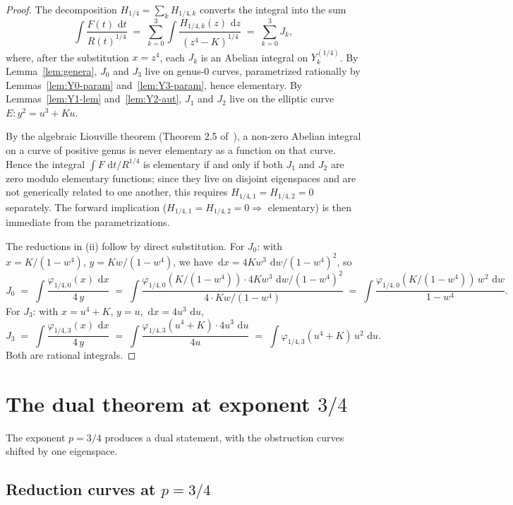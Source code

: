 \documentclass[11pt,a4paper]{article}
\theoremstyle{plain}
\theoremstyle{definition}
\theoremstyle{remark}
\renewcommand{\d}{\,\mathrm{d}}
\begin{document}
\begin{proof}
The decomposition $H_{1/4} = \sum_k H_{1/4, k}$ converts the integral into the sum
\[
  \int \frac{F(t)\,\d t}{R(t)^{1/4}} \;=\; \sum_{k=0}^{3} \int \frac{H_{1/4, k}(z)\,\d z}{(z^4 - K)^{1/4}} \;=\; \sum_{k=0}^{3} J_k,
\]
where, after the substitution $x = z^4$, each $J_k$ is an Abelian integral on $Y_k^{(1/4)}$. By Lemma~\ref{lem:genera}, $J_0$ and $J_3$ live on genus-$0$ curves, parametrized rationally by Lemmas~\ref{lem:Y0-param} and~\ref{lem:Y3-param}, hence elementary. By Lemmas~\ref{lem:Y1-lem} and~\ref{lem:Y2-aut}, $J_1$ and $J_2$ live on the elliptic curve $E\colon y^2 = u^3 + Ku$.

By the algebraic Liouville theorem (Theorem 2.5 of~\cite{GoursatCubic}), a non-zero Abelian integral on a curve of positive genus is never elementary as a function on that curve. Hence the integral $\int F\,\d t / R^{1/4}$ is elementary if and only if both $J_1$ and $J_2$ are zero modulo elementary functions; since they live on disjoint eigenspaces and are not generically related to one another, this requires $H_{1/4, 1} = H_{1/4, 2} = 0$ separately. The forward implication ($H_{1/4, 1} = H_{1/4, 2} = 0 \Rightarrow$ elementary) is then immediate from the parametrizations.

The reductions in (ii) follow by direct substitution. For $J_0$: with $x = K/(1-w^4)$, $y = Kw/(1-w^4)$, we have $\d x = 4 K w^3\,\d w/(1-w^4)^2$, so
\[
  J_0 \;=\; \int \frac{\varphi_{1/4,0}(x)\,\d x}{4\,y} \;=\; \int \frac{\varphi_{1/4,0}(K/(1-w^4)) \cdot 4 K w^3\,\d w / (1-w^4)^2}{4 \cdot K w/(1-w^4)} \;=\; \int \frac{\varphi_{1/4,0}(K/(1-w^4))\,w^2\,\d w}{1 - w^4}.
\]
For $J_3$: with $x = u^4 + K$, $y = u$, $\d x = 4u^3\,\d u$,
\[
  J_3 \;=\; \int \frac{\varphi_{1/4,3}(x)\,\d x}{4\,y} \;=\; \int \frac{\varphi_{1/4,3}(u^4 + K) \cdot 4 u^3\,\d u}{4 u} \;=\; \int \varphi_{1/4,3}(u^4 + K)\,u^2\,\d u.
\]
Both are rational integrals.
\end{proof}

\section{The dual theorem at exponent \texorpdfstring{$3/4$}{3/4}}\label{sec:p34}

The exponent $p = 3/4$ produces a dual statement, with the obstruction curves shifted by one eigenspace.

\subsection*{Reduction curves at $p = 3/4$}
\end{document}

